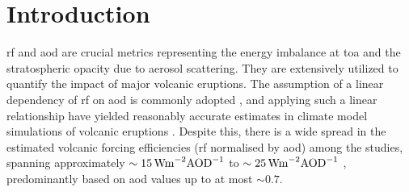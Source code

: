 \documentclass{ametsocV6.1}
\begin{document}

\section{Introduction}



\Gls{rf} and \gls{aod} are crucial metrics representing the energy imbalance at
\gls{toa} and the stratospheric opacity due to aerosol scattering. They are extensively
utilized to quantify the impact of major volcanic eruptions. The assumption of a linear
dependency of \gls{rf} on \gls{aod} is commonly adopted \citep{myhre2013,andersson2015},
and applying such a linear relationship have yielded reasonably accurate estimates in
climate model simulations of volcanic eruptions
\citep{mills2017,hansen2005,gregory2016,marshall2020,pitari2016b}. Despite this, there
is a wide spread in the estimated volcanic forcing efficiencies (\gls{rf} normalised by
\gls{aod}) among the studies, spanning approximately \(\sim
\SI{15}{\watt\metre^{-2}\ce{AOD}^{-1}}\) \citep{pitari2016b} to \(\sim
\SI{25}{\watt\metre^{-2}\ce{AOD}^{-1}}\) \citep{myhre2013}, predominantly based on
\gls{aod} values up to at most \(\sim 0.7\).
\end{document}
